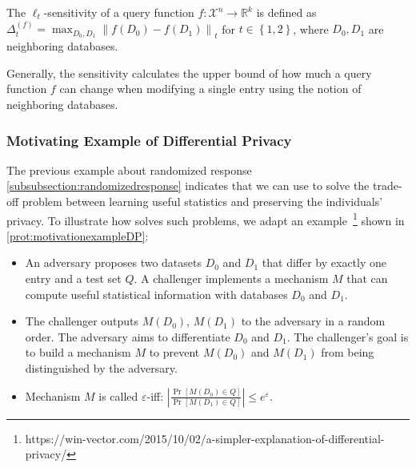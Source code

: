 \begin{definition}
    The $\ell_{t}$-sensitivity of a query function $f : \mathcal{X}^{n} \rightarrow \mathbb{R}^{k}$ is defined as $\Delta ^{\left(f\right)}_{t}=\max _{D_{0},D_{1}} \left\| f\left( D_{0}\right) -f\left( D_{1}\right) \right\| _{t}$ for $t \in \left\{1,2\right\}$, where $D_{0},D_{1}$ are neighboring databases.
    \label{def:sensitivity}
\end{definition}
Generally, the sensitivity calculates the upper bound of how much a query function $f$ can change when modifying a single entry using the notion of neighboring databases.




\subsubsection{Motivating Example of Differential Privacy}
\label{subsubsec:motivatingexampleDP}
The previous example about randomized response \autoref{subsubsection:randomizedresponse} indicates that we can use \differentialprivacy to solve the trade-off problem between learning useful statistics and preserving the individuals' privacy.
To illustrate how \differentialprivacy solves such problems, we adapt an example~\footnote{https://win-vector.com/2015/10/02/a-simpler-explanation-of-differential-privacy/} shown in \autoref{prot:motivationexampleDP}:
\begin{itemize}
    \item An adversary proposes two datasets $D_{0}$ and $D_{1}$ that differ by exactly one entry and a test set $Q$. A challenger implements a mechanism $M$ that can compute useful statistical information with databases $D_{0}$ and $D_{1}$.
    \item The challenger outputs $M\left( D_{0}\right) $, $M\left( D_{1}\right) $ to the adversary in a random order. The adversary aims to differentiate $D_{0}$ and $D_{1}$. The challenger's goal is to build a mechanism $M$ to prevent $M\left( D_{0}\right) $ and $M\left( D_{1}\right) $ from being distinguished by the adversary.
    \item Mechanism $M$ is called $\varepsilon$-\differentialprivacy iff: $\left| \frac{\Pr \left[ M\left( D_{0}\right) \in Q\right] }{\Pr \left[ M\left( D_{1}\right) \in Q \right] }\right|\leq e^{\varepsilon}$.
\end{itemize}

